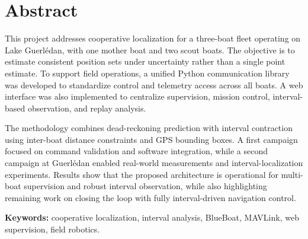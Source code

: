 \section*{Abstract}
This project addresses cooperative localization for a three-boat fleet operating on Lake Guerlédan, with one mother boat and two scout boats. The objective is to estimate consistent position sets under uncertainty rather than a single point estimate. To support field operations, a unified Python communication library was developed to standardize control and telemetry access across all boats. A web interface was also implemented to centralize supervision, mission control, interval-based observation, and replay analysis.

The methodology combines dead-reckoning prediction with interval contraction using inter-boat distance constraints and GPS bounding boxes. A first campaign focused on command validation and software integration, while a second campaign at Guerlédan enabled real-world measurements and interval-localization experiments. Results show that the proposed architecture is operational for multi-boat supervision and robust interval observation, while also highlighting remaining work on closing the loop with fully interval-driven navigation control.

\noindent\textbf{Keywords:} cooperative localization, interval analysis, BlueBoat, MAVLink, web supervision, field robotics.

\newpage
